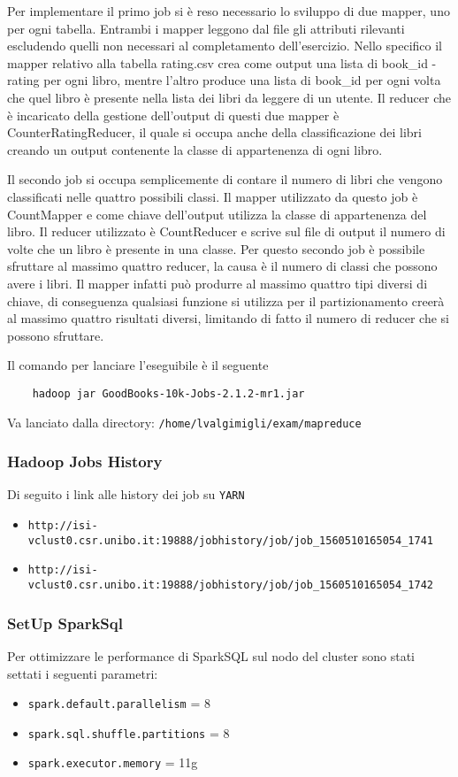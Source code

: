 Per implementare il primo job si è reso necessario lo sviluppo di due mapper, uno per ogni tabella.
Entrambi i mapper leggono dal file gli attributi rilevanti escludendo quelli non necessari al completamento dell'esercizio.
Nello specifico il mapper relativo alla tabella rating.csv crea come output una lista di book\_id - rating per ogni libro, mentre l'altro
produce una lista di book\_id per ogni volta che quel libro è presente nella lista dei libri da leggere di un utente.
Il reducer che è incaricato della gestione dell'output di questi due mapper è CounterRatingReducer, il quale si occupa anche della classificazione dei
libri creando un output contenente la classe di appartenenza di ogni libro.

Il secondo job si occupa semplicemente di contare il numero di libri che vengono classificati nelle quattro possibili classi.
Il mapper utilizzato da questo job è CountMapper e come chiave dell'output utilizza la classe di appartenenza del libro.
Il reducer utilizzato è CountReducer e scrive sul file di output il numero di volte che un libro è presente in una classe.
Per questo secondo job è possibile sfruttare al massimo quattro reducer, la causa è il numero di classi che possono avere i libri.
Il mapper infatti può produrre al massimo quattro tipi diversi di chiave, di conseguenza qualsiasi funzione si utilizza per il partizionamento
creerà al massimo quattro risultati diversi, limitando di fatto il numero di reducer che si possono sfruttare.

Il comando per lanciare l'eseguibile è il seguente
\begin{verbatim}
    hadoop jar GoodBooks-10k-Jobs-2.1.2-mr1.jar
\end{verbatim}
Va lanciato dalla directory: \texttt{/home/lvalgimigli/exam/mapreduce}


\subsubsection{Hadoop Jobs History}

Di seguito i link alle history dei job su \texttt{YARN}
\begin{itemize}
    \item \texttt{http://isi-vclust0.csr.unibo.it:19888/jobhistory/job/job\_1560510165054\_1741}
    \item \texttt{http://isi-vclust0.csr.unibo.it:19888/jobhistory/job/job\_1560510165054\_1742}
\end{itemize}

\subsubsection{SetUp SparkSql}
Per ottimizzare le performance di SparkSQL sul nodo del cluster sono stati settati i seguenti parametri:
\begin{itemize}
    \item \texttt{spark.default.parallelism} = 8
    \item \texttt{spark.sql.shuffle.partitions} = 8
    \item \texttt{spark.executor.memory} = 11g
\end{itemize}

